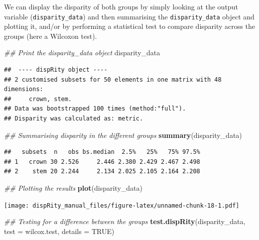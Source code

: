 \documentclass[
]{book}
\newenvironment{Shaded}{\begin{snugshade}}{\end{snugshade}}
\newcommand{\CommentTok}[1]{\textcolor[rgb]{0.56,0.35,0.01}{\textit{#1}}}
\newcommand{\DataTypeTok}[1]{\textcolor[rgb]{0.13,0.29,0.53}{#1}}
\newcommand{\KeywordTok}[1]{\textcolor[rgb]{0.13,0.29,0.53}{\textbf{#1}}}
\newcommand{\NormalTok}[1]{#1}
\newcommand{\OtherTok}[1]{\textcolor[rgb]{0.56,0.35,0.01}{#1}}
\begin{document}
We can display the disparity of both groups by simply looking at the output variable (\texttt{disparity\_data}) and then summarising the \texttt{disparity\_data} object and plotting it, and/or by performing a statistical test to compare disparity across the groups (here a Wilcoxon test).

\begin{Shaded}
\begin{Highlighting}[]
\CommentTok{\#\# Print the disparity\_data object}
\NormalTok{disparity\_data}
\end{Highlighting}
\end{Shaded}

\begin{verbatim}
##  ---- dispRity object ---- 
## 2 customised subsets for 50 elements in one matrix with 48 dimensions:
##     crown, stem.
## Data was bootstrapped 100 times (method:"full").
## Disparity was calculated as: metric.
\end{verbatim}

\begin{Shaded}
\begin{Highlighting}[]
\CommentTok{\#\# Summarising disparity in the different groups}
\KeywordTok{summary}\NormalTok{(disparity\_data)}
\end{Highlighting}
\end{Shaded}

\begin{verbatim}
##   subsets  n   obs bs.median  2.5%   25%   75% 97.5%
## 1   crown 30 2.526     2.446 2.380 2.429 2.467 2.498
## 2    stem 20 2.244     2.134 2.025 2.105 2.164 2.208
\end{verbatim}

\begin{Shaded}
\begin{Highlighting}[]
\CommentTok{\#\# Plotting the results}
\KeywordTok{plot}\NormalTok{(disparity\_data)}
\end{Highlighting}
\end{Shaded}

\texttt{[image: dispRity\_manual\_files/figure-latex/unnamed-chunk-18-1.pdf]}

\begin{Shaded}
\begin{Highlighting}[]
\CommentTok{\#\# Testing for a difference between the groups}
\KeywordTok{test.dispRity}\NormalTok{(disparity\_data, }\DataTypeTok{test =}\NormalTok{ wilcox.test, }\DataTypeTok{details =} \OtherTok{TRUE}\NormalTok{)}
\end{Highlighting}
\end{Shaded}
\end{document}

